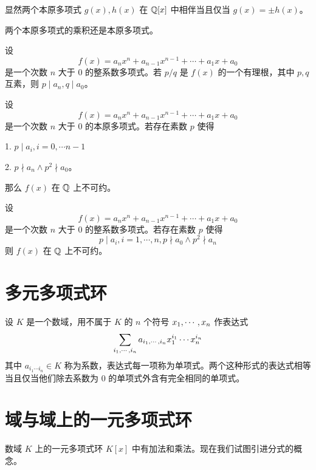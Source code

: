显然两个本原多项式 $g(x), h(x)$ 在 $\mathbb{Q}[x]$ 中相伴当且仅当 $g(x) = \pm h(x)$。

\begin{theorem}[Gauss 引理]
    两个本原多项式的乘积还是本原多项式。
\end{theorem}

\begin{theorem}
    设
    \[ f(x) = a_nx^n + a_{n-1}x^{n-1} + \cdots + a_1x + a_0\]
    是一个次数 $n$ 大于 $0$ 的整系数多项式。若 $p/q$ 是 $f(x)$ 的一个有理根，其中 $p,q$ 互素，则 $p \mid a_n, q \mid a_0$。
\end{theorem}

\begin{theorem}
    设
    \[ f(x) = a_nx^n + a_{n-1}x^{n-1} + \cdots + a_1x + a_0\]
    是一个次数 $n$ 大于 $0$ 的本原多项式。若存在素数 $p$ 使得

    1. $p \mid a_i, i = 0,\cdots n-1$

    2. $p \nmid a_n \land p^2 \nmid a_0$。

    那么 $f(x)$ 在 $\mathbb{Q}$ 上不可约。
\end{theorem}

\begin{theorem}
    设
    \[ f(x) = a_nx^n + a_{n-1}x^{n-1} + \cdots + a_1x + a_0\]
    是一个次数 $n$ 大于 $0$ 的整系数多项式。若存在素数 $p$ 使得
    \[ p \mid a_i, i = 1,\cdots,n, p \nmid a_0 \land  p^2 \nmid a_n \]
    则 $f(x)$ 在 $\mathbb{Q}$ 上不可约。
\end{theorem}

\section{多元多项式环}

\begin{definition}
    设 $K$ 是一个数域，用不属于 $K$ 的 $n$ 个符号 $x_1,\cdots,x_n$ 作表达式
    \[ \sum_{i_1,\cdots,i_n}a_{i_1,\cdots,i_n} x_1^{i_1}\cdots x_n^{i_n} \]
    其中 $a_{i_1\cdots i_n} \in K$ 称为系数，表达式每一项称为单项式。两个这种形式的表达式相等当且仅当他们除去系数为 $0$ 的单项式外含有完全相同的单项式。
\end{definition}

\section{域与域上的一元多项式环}

数域 $K$ 上的一元多项式环 $K[x]$ 中有加法和乘法。现在我们试图引进分式的概念。

